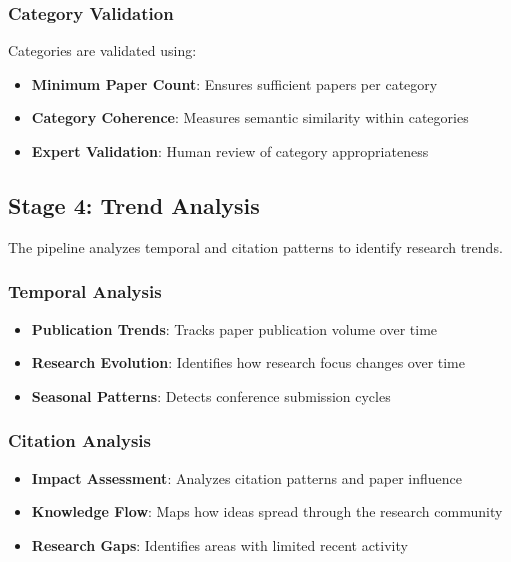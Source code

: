 \subsubsection{Category Validation}

Categories are validated using:
\begin{itemize}
    \item \textbf{Minimum Paper Count}: Ensures sufficient papers per category
    \item \textbf{Category Coherence}: Measures semantic similarity within categories
    \item \textbf{Expert Validation}: Human review of category appropriateness
\end{itemize}

\subsection{Stage 4: Trend Analysis}

The pipeline analyzes temporal and citation patterns to identify research trends.

\subsubsection{Temporal Analysis}

\begin{itemize}
    \item \textbf{Publication Trends}: Tracks paper publication volume over time
    \item \textbf{Research Evolution}: Identifies how research focus changes over time
    \item \textbf{Seasonal Patterns}: Detects conference submission cycles
\end{itemize}

\subsubsection{Citation Analysis}

\begin{itemize}
    \item \textbf{Impact Assessment}: Analyzes citation patterns and paper influence
    \item \textbf{Knowledge Flow}: Maps how ideas spread through the research community
    \item \textbf{Research Gaps}: Identifies areas with limited recent activity
\end{itemize}

